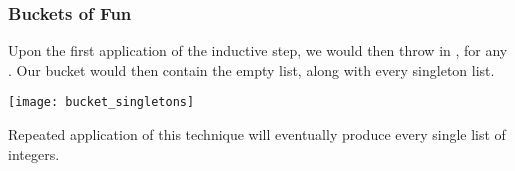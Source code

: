 \documentclass[aspectratio=169, handout]{beamer}
\begin{document}
\begin{frame}[fragile]
  \frametitle{Buckets of Fun}

  \rprs

  Upon the first application of the inductive step, we would then throw in , for any
  . Our bucket would then contain the empty list, along with every singleton
  list.

  \pause
  \begin{center} \texttt{[image: bucket\_singletons]} \end{center}

  \pause
  \vspace{\fill}

  Repeated application of this technique will eventually produce every single list of integers.
\end{frame}
\end{document}
